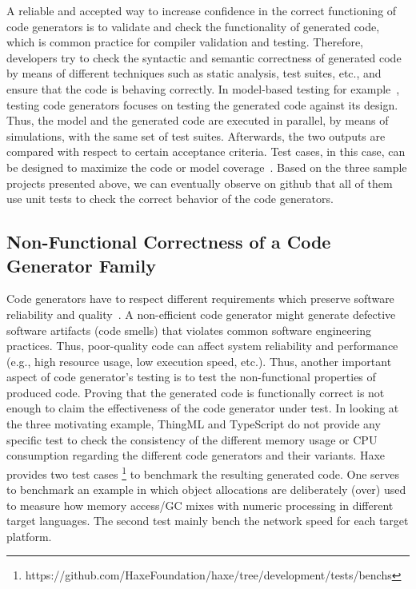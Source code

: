 A reliable and accepted way to increase confidence in the correct functioning of code generators is to validate and check the functionality of generated code, which is common practice for compiler validation and testing.
Therefore, developers try to check the syntactic and semantic correctness of generated code by means of different techniques such as static analysis, test suites, etc., and ensure that the code is behaving correctly.  In model-based testing for example~\cite{jorges2014back,stuermer2007systematic}, testing code generators focuses on testing the generated code against its design. Thus, the model and the generated code are executed in parallel, by means of simulations, with the same set of test suites. Afterwards, the two outputs are compared with respect to certain acceptance criteria. Test cases, in this case, can be designed to maximize the code or model coverage~\cite{sturmer2005overview}. 
Based on the three sample projects presented above, we can eventually observe on github that all of them use unit tests to check the correct behavior of the code generators.  

\subsection{Non-Functional Correctness of a Code Generator Family}


Code generators have to respect different requirements which preserve software reliability and quality~\cite{demertzi2011analyzing}. A non-efficient code generator might generate defective software artifacts (code smells) that violates common software engineering practices. Thus, poor-quality code can affect system reliability and performance (e.g., high resource usage, low execution speed, etc.). Thus, another important aspect of code generator's testing is to test the non-functional properties of produced code. Proving that the generated code is functionally correct is not enough to claim the effectiveness of the code generator under test. In looking at the three motivating example, ThingML and TypeScript do not provide any specific test to check the consistency of the different memory usage or CPU consumption regarding the different code generators and their variants. Haxe provides two test cases \footnote{https://github.com/HaxeFoundation/haxe/tree/development/tests/benchs} to benchmark the resulting generated code. One serves to benchmark an example in which object allocations are deliberately (over) used to measure how memory access/GC mixes with numeric processing in different target languages. The second test mainly bench the network speed for each target platform. 

